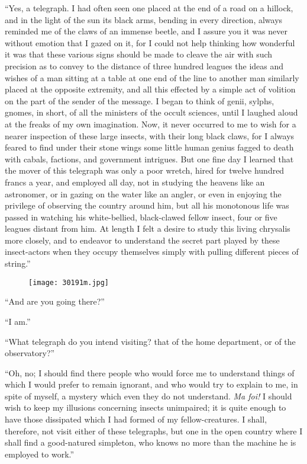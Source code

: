 “Yes, a telegraph. I had often seen one placed at the end of a road on
a hillock, and in the light of the sun its black arms, bending in every
direction, always reminded me of the claws of an immense beetle, and I
assure you it was never without emotion that I gazed on it, for I could
not help thinking how wonderful it was that these various signs should
be made to cleave the air with such precision as to convey to the
distance of three hundred leagues the ideas and wishes of a man sitting
at a table at one end of the line to another man similarly placed at
the opposite extremity, and all this effected by a simple act of
volition on the part of the sender of the message. I began to think of
genii, sylphs, gnomes, in short, of all the ministers of the occult
sciences, until I laughed aloud at the freaks of my own imagination.
Now, it never occurred to me to wish for a nearer inspection of these
large insects, with their long black claws, for I always feared to find
under their stone wings some little human genius fagged to death with
cabals, factions, and government intrigues. But one fine day I learned
that the mover of this telegraph was only a poor wretch, hired for
twelve hundred francs a year, and employed all day, not in studying the
heavens like an astronomer, or in gazing on the water like an angler,
or even in enjoying the privilege of observing the country around him,
but all his monotonous life was passed in watching his white-bellied,
black-clawed fellow insect, four or five leagues distant from him. At
length I felt a desire to study this living chrysalis more closely, and
to endeavor to understand the secret part played by these insect-actors
when they occupy themselves simply with pulling different pieces of
string.”

\begin{figure}[ht]
\texttt{[image: 30191m.jpg]}
\end{figure}

“And are you going there?”

“I am.”

“What telegraph do you intend visiting? that of the home department, or
of the observatory?”

“Oh, no; I should find there people who would force me to understand
things of which I would prefer to remain ignorant, and who would try to
explain to me, in spite of myself, a mystery which even they do not
understand. \textit{Ma foi!} I should wish to keep my illusions concerning
insects unimpaired; it is quite enough to have those dissipated which I
had formed of my fellow-creatures. I shall, therefore, not visit either
of these telegraphs, but one in the open country where I shall find a
good-natured simpleton, who knows no more than the machine he is
employed to work.”

